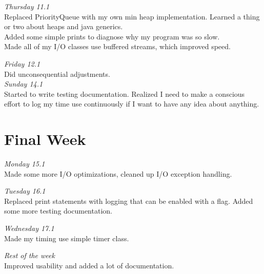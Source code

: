 \documentclass[11pt,a4paper,oneside,notitlepage,final]{article}
\begin{document}
	\emph{Thursday 11.1}\\
	Replaced PriorityQueue with my own min heap implementation. Learned a thing or two about heaps and java generics.\\
	Added some simple prints to diagnose why my program was so slow.\\
	Made all of my I/O classes use buffered streams, which improved speed.
	
	\emph{Friday 12.1}\\
	Did unconsequential adjustments.\\
	
	\emph{Sunday 14.1}\\
	Started to write testing documentation.
	Realized I need to make a conscious effort to log my time use continuously if I want to have any idea about anything.
	
	\section{Final Week}
	
	\emph{Monday 15.1}\\
	Made some more I/O optimizations, cleaned up I/O exception handling.
	
	\emph{Tuesday 16.1}\\
	Replaced print statements with logging that can be enabled with a flag.
	Added some more testing documentation.
	
	\emph{Wednesday 17.1}\\
	Made my timing use simple timer class.

	\emph{Rest of the week}\\
	Improved usability and added a lot of documentation.
	
	
	
	
\end{document}
